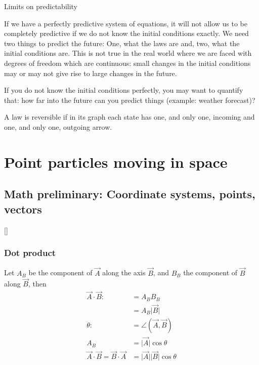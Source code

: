 \documentclass[pagesize,headsepline,10pt,parskip=half]{scrreprt}
\newcommand{\abs}[1]{\lvert#1\rvert}
\newenvironment{aside}
  {\begin{mdframed}[style=0,%
      leftline=false,rightline=false,leftmargin=2em,rightmargin=2em,%
          innerleftmargin=0pt,innerrightmargin=0pt,linewidth=0.75pt,%
      skipabove=7pt,skipbelow=7pt]\small}
  {\end{mdframed}}
\begin{document}
        \begin{aside}
          Limits on predictability

          If we have a perfectly predictive system of equations, it will not
          allow us to be completely predictive if we do not know the initial
          conditions exactly.  We need two things to predict the future: One,
          what the laws are and, two, what the initial conditions are.  This is not
          true in the real world where we are faced with degrees of freedom
          which are continuous: small changes in the initial conditions may or
          may not give rise to large changes in the future.

          If you do not know the initial conditions perfectly, you may want to
          quantify that: how far into the future can you predict things
          (example: weather forecast)?
        \end{aside}

        A law is reversible if in its graph each state has one, and only one,
        incoming and one, and only one, outgoing arrow.

    \section{Point particles moving in space}
      \subsection{Math preliminary: Coordinate systems, points, vectors}
        [\textellipsis]

        \subsubsection{Dot product}
          Let $A_B$ be the component of $\vec A$ along the axis $\vec B$, and
          $B_B$ the component of $\vec B$ along $\vec B$, then
          \begin{align*}
            \vec A \cdot \vec B :&= A_B B_B \\
            &= A_B \abs{\vec B} \\
            \theta :&= \angle (\vec A, \vec B) \\
            A_B &= \abs{\vec A} \cos{\theta} \\
            \vec A \cdot \vec B = \vec B \cdot \vec A &= \abs{\vec A}
            \abs{\vec B} \cos{\theta} \\
          \end{align*}
\end{document}
